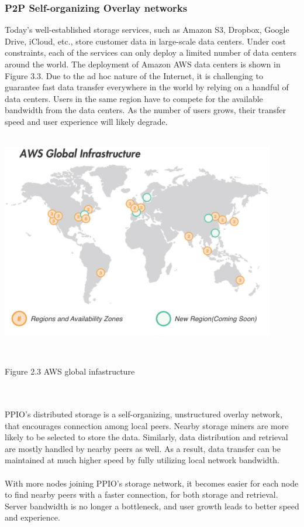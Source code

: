 \documentclass[10pt,a4paper]{article}
\begin{document}
         \subsubsection{P2P Self-organizing Overlay networks}  %
         \vspace{-0.5em}
Today’s well-established storage services, such as Amazon S3, Dropbox, Google Drive, iCloud, etc., store customer data in large-scale data centers. Under cost constraints, each of the services can only deploy a limited number of data centers around the world. The deployment of Amazon AWS data centers is shown in Figure 3.3. Due to the ad hoc nature of the Internet, it is challenging to guarantee fast data transfer everywhere in the world by relying on a handful of data centers. Users in the same region have to compete for the available bandwidth from the data centers. As the number of users grows, their transfer speed and user experience will likely degrade.
\vspace{-0.5em}
 \\ \\ \centerline{\includegraphics[width=340pt]{fig3}}
\\ \centerline{{Figure 2.3 AWS global infastructure}}
\\ \\ PPIO’s distributed storage is a self-organizing, unstructured overlay network, that encourages connection among local peers. Nearby storage miners are more likely to be selected to store the data. Similarly, data distribution and retrieval are mostly handled by nearby peers as well. As a result, data transfer can be maintained at much higher speed by fully utilizing local network bandwidth.
\vspace{-0.5em}
\\ \\With more nodes joining PPIO’s storage network, it becomes easier for each node to find nearby peers with a faster connection, for both storage and retrieval. Server bandwidth is no longer a bottleneck, and user growth leads to better speed and experience.
\end{document}
